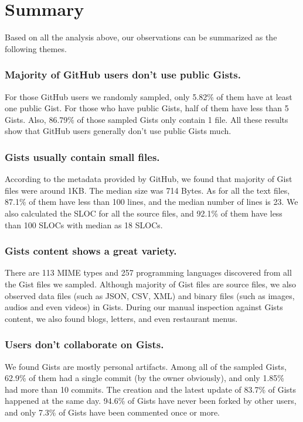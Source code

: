 \section{Summary}

Based on all the analysis above, our observations can be summarized as the following themes.

\subsubsection{Majority of GitHub users don't use public Gists.}

For those GitHub users we randomly sampled, only 5.82\% of them have at least one public Gist. For those who have public Gists, half of them have less than 5 Gists. Also, 86.79\% of those sampled Gists only contain 1 file. All these results show that GitHub users generally don't use public Gists much. 

\subsubsection{Gists usually contain small files.}

According to the metadata provided by GitHub, we found that majority of Gist files were around 1KB. The median size was 714 Bytes. As for all the text files, 87.1\% of them have less than 100 lines, and the median number of lines is 23. We also calculated the SLOC for all the source files, and 92.1\% of them have less than 100 SLOCs with median as 18 SLOCs. 

\subsubsection{Gists content shows a great variety.}

There are 113 MIME types and 257 programming languages discovered from all the Gist files we sampled. Although majority of Gist files are source files, we also observed data files (such as JSON, CSV, XML) and binary files (such as images, audios and even videos) in Gists. During our manual inspection against Gists content, we also found blogs, letters, and even restaurant menus. 

\subsubsection{Users don't collaborate on Gists.}
We found Gists are mostly personal artifacts. Among all of the sampled Gists, 62.9\% of them had a single commit (by the owner obviously), and only 1.85\% had more than 10 commits. The creation and the latest update of 83.7\% of Gists happened at the same day. 94.6\% of Gists have never been forked by other users, and only 7.3\% of Gists have been commented once or more. 

